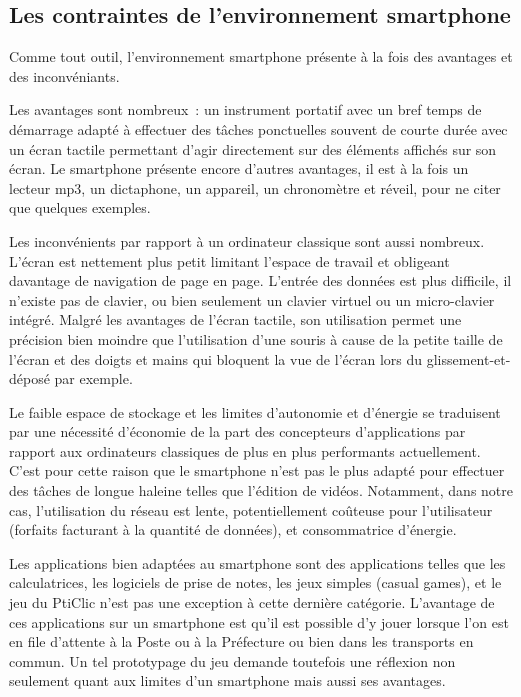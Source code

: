 \documentclass[a4paper,11pt,french]{article}
\begin{document}
\subsection{Les contraintes de l'environnement smartphone}

Comme tout outil, l'environnement smartphone présente à la fois des avantages et des inconvéniants. 

Les avantages sont nombreux~: un instrument portatif avec un bref temps de démarrage adapté à effectuer des tâches ponctuelles souvent de courte durée avec un écran tactile permettant d'agir directement sur des éléments affichés sur son écran. Le smartphone présente encore d'autres avantages, il est à la fois un lecteur mp3, un dictaphone, un appareil, un chronomètre et réveil, pour ne citer que quelques exemples.

Les inconvénients par rapport à un ordinateur classique sont aussi nombreux. L'écran est nettement plus petit limitant l'espace de travail
et obligeant davantage de navigation de page en page. L'entrée des données est plus difficile, il n'existe pas de clavier, ou bien seulement
un clavier virtuel ou un micro-clavier intégré. Malgré les avantages de l'écran tactile, son utilisation permet une précision bien moindre
que l'utilisation d'une souris à cause de la petite taille de l'écran et des doigts et mains qui bloquent la vue de l'écran lors du
glissement-et-déposé par exemple.

Le faible espace de stockage et les limites d'autonomie et d'énergie se traduisent par une nécessité d'économie de la part des concepteurs
d'applications par rapport aux ordinateurs classiques de plus en plus performants actuellement. C'est pour cette raison que le smartphone
n'est pas le plus adapté pour effectuer des tâches de longue haleine telles que l'édition de vidéos. Notamment, dans notre cas,
l'utilisation du réseau est lente, potentiellement coûteuse pour l'utilisateur (forfaits facturant à la quantité de données), et
consommatrice d'énergie.

Les applications bien adaptées au smartphone sont des applications telles que les calculatrices, les logiciels de prise de notes, les jeux
simples (casual games), et le jeu du PtiClic n'est pas une exception à cette dernière catégorie. L'avantage de ces applications sur un smartphone est
qu'il est possible d'y jouer lorsque l'on est en file d'attente à la Poste ou à la Préfecture ou bien dans les transports en commun. Un tel
prototypage du jeu demande toutefois une réflexion non seulement quant aux limites d'un smartphone mais aussi ses avantages.
\end{document}
